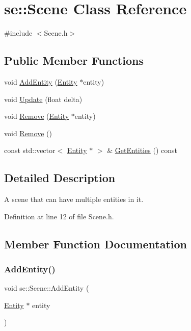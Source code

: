 \hypertarget{classse_1_1_scene}{}\section{se\+:\+:Scene Class Reference}
\label{classse_1_1_scene}


{\ttfamily \#include $<$Scene.\+h$>$}

\subsection*{Public Member Functions}
\begin{DoxyCompactItemize}
\item 
void \mbox{\hyperlink{classse_1_1_scene_a21dde7d731d672d4c424397850864549}{Add\+Entity}} (\mbox{\hyperlink{classse_1_1_entity}{Entity}} $\ast$entity)
\item 
void \mbox{\hyperlink{classse_1_1_scene_acdc3858f5d4fd76cf9a712a02218341a}{Update}} (float delta)
\item 
void \mbox{\hyperlink{classse_1_1_scene_a4133b3e65c59229d8926dde7976ec004}{Remove}} (\mbox{\hyperlink{classse_1_1_entity}{Entity}} $\ast$entity)
\item 
void \mbox{\hyperlink{classse_1_1_scene_a73f7789f2585e65174380be509b88435}{Remove}} ()
\item 
const std\+::vector$<$ \mbox{\hyperlink{classse_1_1_entity}{Entity}} $\ast$ $>$ \& \mbox{\hyperlink{classse_1_1_scene_a1367cf1066c13c94fde1236b5dd5b208}{Get\+Entities}} () const
\end{DoxyCompactItemize}


\subsection{Detailed Description}
A scene that can have multiple entities in it. 

Definition at line 12 of file Scene.\+h.



\subsection{Member Function Documentation}
\mbox{\label{classse_1_1_scene_a21dde7d731d672d4c424397850864549}} 
\subsubsection{\texorpdfstring{Add\+Entity()}{AddEntity()}}
{\footnotesize\ttfamily void se\+::\+Scene\+::\+Add\+Entity (\begin{DoxyParamCaption}\item[{\mbox{\hyperlink{classse_1_1_entity}{Entity}} $\ast$}]{entity }\end{DoxyParamCaption})}

